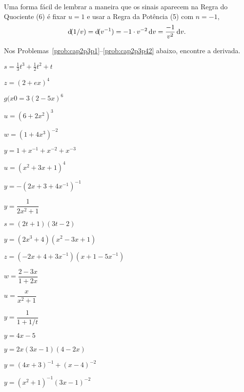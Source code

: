 Uma forma fácil de lembrar a maneira que os sinais aparecem na Regra do Quociente (6) é fixar $u = 1$ e usar a Regra da Potência (5) com $n = -1$,
$$
  \dif(1/v) = \dif(v^{-1}) = -1 \cdot v^{-2} \dv = \frac{-1}{v^2} \dv.
$$

\begin{sectionproblems}
Nos Problemas~\ref{prob:cap2p3p1}--\ref{prob:cap2p3p42} abaixo, encontre a
derivada.

%
        {$s = \frac{1}{3}t^3 + \frac{1}{2}t^2 +t$}

%
        {$z = (2+ex)^4$}

%
        {$g(x0 = 3(2-5x)^6$}

%
        {$u = (6 + 2x^2)^3$}

%
        {$w = (1+4x^3)^{-2}$}

%
        {$y = 1 + x^{-1} + x^{-2} + x^{-3}$}

%
        {$u = (x^2 + 3x + 1)^4$}

%
        {$y = -(2x + 3 + 4x^{-1})^{-1}$}

%
        {$y = \dfrac{1}{2x^2 + 1}$}

%
        {$s = (2t + 1)(3t - 2)$}

%
        {$y = (2x^3 + 4)(x^2 - 3x + 1)$}

%
        {$z = (-2x \! + \! 4 \! + \! 3x^{-1})(x \! + \! 1 \! - \! 5x^{-1})$}

%
        {$w = \dfrac{2 - 3x}{1 + 2x}$}

%
        {$u = \dfrac{x}{x^2 + 1}$}

%
        {$y = \dfrac{1}{1+1/t}$}

%
        {$y = 4x - 5$}

%
        {$y = 2x(3x-1)(4 - 2x)$}

%
        {$y = (4x + 3)^{-1} + (x-4)^{-2}$}

%
        {$y = (x^2 + 1)^{-1}(3x-1)^{-2}$}


\end{sectionproblems}
